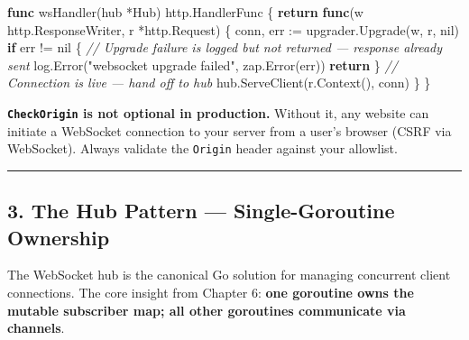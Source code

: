 \documentclass[
]{article}
\newenvironment{Shaded}{}{}
\newcommand{\CommentTok}[1]{\textcolor[rgb]{0.38,0.63,0.69}{\textit{#1}}}
\newcommand{\ControlFlowTok}[1]{\textcolor[rgb]{0.00,0.44,0.13}{\textbf{#1}}}
\newcommand{\KeywordTok}[1]{\textcolor[rgb]{0.00,0.44,0.13}{\textbf{#1}}}
\newcommand{\NormalTok}[1]{#1}
\newcommand{\OperatorTok}[1]{\textcolor[rgb]{0.40,0.40,0.40}{#1}}
\newcommand{\OtherTok}[1]{\textcolor[rgb]{0.00,0.44,0.13}{#1}}
\newcommand{\StringTok}[1]{\textcolor[rgb]{0.25,0.44,0.63}{#1}}
\begin{document}
\begin{Shaded}
\begin{Highlighting}[]
\KeywordTok{func}\NormalTok{ wsHandler}\OperatorTok{(}\NormalTok{hub }\OperatorTok{*}\NormalTok{Hub}\OperatorTok{)}\NormalTok{ http}\OperatorTok{.}\NormalTok{HandlerFunc }\OperatorTok{\{}
    \ControlFlowTok{return} \KeywordTok{func}\OperatorTok{(}\NormalTok{w http}\OperatorTok{.}\NormalTok{ResponseWriter}\OperatorTok{,}\NormalTok{ r }\OperatorTok{*}\NormalTok{http}\OperatorTok{.}\NormalTok{Request}\OperatorTok{)} \OperatorTok{\{}
\NormalTok{        conn}\OperatorTok{,}\NormalTok{ err }\OperatorTok{:=}\NormalTok{ upgrader}\OperatorTok{.}\NormalTok{Upgrade}\OperatorTok{(}\NormalTok{w}\OperatorTok{,}\NormalTok{ r}\OperatorTok{,} \OtherTok{nil}\OperatorTok{)}
        \ControlFlowTok{if}\NormalTok{ err }\OperatorTok{!=} \OtherTok{nil} \OperatorTok{\{}
            \CommentTok{// Upgrade failure is logged but not returned — response already sent}
\NormalTok{            log}\OperatorTok{.}\NormalTok{Error}\OperatorTok{(}\StringTok{"websocket upgrade failed"}\OperatorTok{,}\NormalTok{ zap}\OperatorTok{.}\NormalTok{Error}\OperatorTok{(}\NormalTok{err}\OperatorTok{))}
            \ControlFlowTok{return}
        \OperatorTok{\}}
        \CommentTok{// Connection is live — hand off to hub}
\NormalTok{        hub}\OperatorTok{.}\NormalTok{ServeClient}\OperatorTok{(}\NormalTok{r}\OperatorTok{.}\NormalTok{Context}\OperatorTok{(),}\NormalTok{ conn}\OperatorTok{)}
    \OperatorTok{\}}
\OperatorTok{\}}
\end{Highlighting}
\end{Shaded}

\textbf{\texttt{CheckOrigin} is not optional in production.} Without it,
any website can initiate a WebSocket connection to your server from a
user's browser (CSRF via WebSocket). Always validate the \texttt{Origin}
header against your allowlist.

\begin{center}\rule{0.5\linewidth}{0.5pt}\end{center}

\hypertarget{the-hub-pattern-single-goroutine-ownership}{%
\subsection{3. The Hub Pattern --- Single-Goroutine
Ownership}\label{the-hub-pattern-single-goroutine-ownership}}

The WebSocket hub is the canonical Go solution for managing concurrent
client connections. The core insight from Chapter 6: \textbf{one
goroutine owns the mutable subscriber map; all other goroutines
communicate via channels}.
\end{document}
